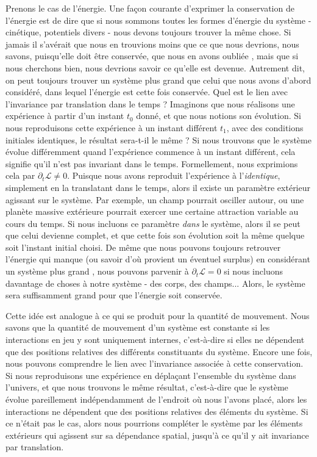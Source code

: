 Prenons le cas de l'énergie. Une façon courante d'exprimer la conservation de l'énergie est de dire que si nous sommons toutes les formes d'énergie du système - cinétique, potentiels divers - nous devons toujours trouver la même chose.
Si jamais il s'avérait que nous en trouvions moins que ce que nous devrions, nous savons, puisqu'elle doit être conservée, que nous en avons \og oubliée \fg, mais que si nous cherchons bien, nous devrions savoir ce qu'elle est devenue. Autrement dit, on peut toujours trouver un système plus grand que celui que nous avons d'abord considéré, dans lequel l'énergie est cette fois conservée. Quel est le lien avec l'invariance par translation dans le temps ? Imaginons que nous réalisons une expérience à partir d'un instant $t_0$ donné, et que nous notions son évolution. Si nous reproduisons cette expérience à un instant différent $t_1$, avec des conditions initiales identiques, le résultat sera-t-il le même ?  Si nous trouvons que le système évolue différemment quand l'expérience commence à un instant différent, cela signifie qu'il n'est pas invariant dans le temps. Formellement, nous exprimions cela par $\partial_t \mathcal{L} \neq 0$. Puisque nous avons reproduit l'expérience à l'\textit{identique}, simplement en la translatant dans le temps, alors il existe un paramètre extérieur agissant sur le système. Par exemple, un champ pourrait osciller autour, ou une planète massive extérieure pourrait exercer une certaine attraction variable au cours du temps. Si nous incluons ce paramètre \textit{dans} le système, alors il se peut que celui devienne complet, et que cette fois son évolution soit la même quelque soit l'instant initial choisi. De même que nous pouvons toujours retrouver l'énergie qui manque (ou savoir d'où provient un éventuel surplus) en considérant un système \og plus grand \fg, nous pouvons parvenir à $\partial_t \mathcal{L} = 0$ si nous incluons davantage de choses à notre système - des corps, des champs... Alors, le système sera suffisamment grand pour que l'énergie soit conservée.

Cette idée est analogue à ce qui se produit pour la quantité de mouvement. Nous savons que la quantité de mouvement d'un système est constante si les interactions en jeu y sont uniquement internes, c'est-à-dire si elles ne dépendent que des positions relatives des différents constituants du système. Encore une fois, nous pouvons comprendre le lien avec l'invariance associée à cette conservation. Si nous reproduisons une expérience en déplaçant l'ensemble du système dans l'univers, et que nous trouvons le même résultat, c'est-à-dire que le système évolue pareillement indépendamment de l'endroit où nous l'avons placé, alors les interactions ne dépendent que des positions relatives des éléments du système. Si ce n'était pas le cas, alors nous pourrions compléter le système par les éléments extérieurs qui agissent sur sa dépendance spatial, jusqu'à ce qu'il y ait invariance par translation.

